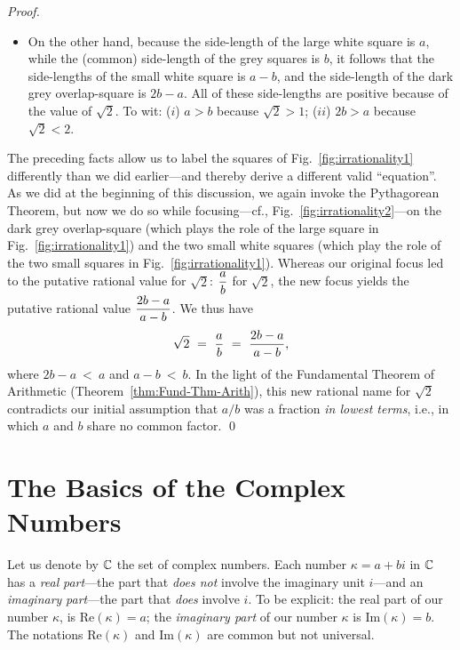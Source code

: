 \begin{proof}
\begin{itemize}
\medskip\item
On the other hand, because the side-length of the large white square is $a$, while the (common) side-length of the grey squares is $b$, it follows that the side-lengths of the small white square is $a-b$, and the side-length of the dark grey overlap-square is $2b-a$.  All of these side-lengths are positive because of the value of $\sqrt{2}$.  To wit: ($i$) $a > b$ because $\sqrt{2} >1$; ($ii$) $2b >a$ because $\sqrt{2} < 2$.
\end{itemize}
The preceding facts allow us to label the squares of Fig.~\ref{fig:irrationality1} differently than we did earlier---and thereby derive a different valid ``equation''.  As we did at the beginning of this discussion, we again invoke the Pythagorean Theorem, but now we do so while focusing---cf., Fig.~\ref{fig:irrationality2}---on the dark grey overlap-square (which plays the role of the large square in Fig.~\ref{fig:irrationality1}) and the two small white squares (which play the role of the two small squares in Fig.~\ref{fig:irrationality1}).  Whereas our original focus led to the putative rational value for $\sqrt{2}$: $\displaystyle {a \over b}$ for $\sqrt{2}$, the new focus yields the putative rational value $\displaystyle {2b-a \over a-b}$.  We thus have
\[ \sqrt{2} \ = \ {a \over b} \ = \ {2b-a \over a-b}, \]
where $2b-a \ < \ a$ and $a-b \ < \ b$.  In the light of the Fundamental Theorem of Arithmetic (Theorem~\ref{thm:Fund-Thm-Arith}), this new rational name for $\sqrt{2}$ contradicts our initial assumption that $a/b$ was a fraction {\em in lowest  terms}, i.e., in which $a$ and $b$ share no common factor.  \qed
\end{proof}


\section{The Basics of the Complex Numbers}
\label{sec:complexes}

 
 
Let us denote by $\mathbb{C}$ the set of complex numbers.  Each number $\kappa = a+bi$ in $\mathbb{C}$ has a {\it real}  {\em part}---the part that {\em does not} involve the imaginary unit $i$---and an {\it imaginary} {\em part}---the part that {\em does} involve $i$.  To be explicit: the real part of our number $\kappa$, is Re$(\kappa) = a$; the {\it imaginary part} of our number $\kappa$ is Im$(\kappa) = b$.  The notations Re$(\kappa)$ and Im$(\kappa)$ are common but not universal.

